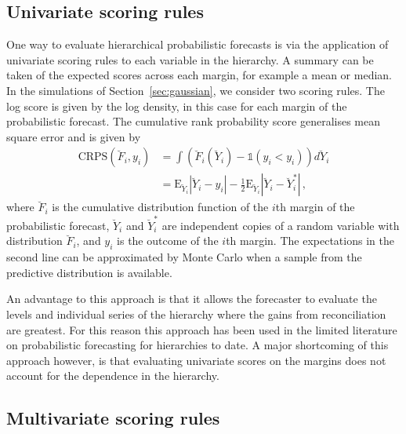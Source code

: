 \documentclass[a4paper, 11pt]{article}
\def\E{\text{E}}
\theoremstyle{definition}
\begin{document}
\subsection{Univariate scoring rules}

One way to evaluate hierarchical probabilistic forecasts is via the application of univariate scoring rules to each variable in the hierarchy. A summary can be taken of the expected scores across each margin, for example a mean or median. In the simulations of Section~\ref{sec:gaussian}, we consider two scoring rules. The log score is given by the log density, in this case for each margin of the probabilistic forecast. The cumulative rank probability score generalises mean square error and is given by
\begin{align} \label{eq:CRPS}
\text{CRPS}(\breve{F}_i,y_{i}) &=\int \left(\breve{F}_i(\breve{Y}_i)-\mathbb{1}(y_i<y_{i})\right)d\breve{Y}_i\\ &=\E_{\breve{Y}_i}|\breve{Y}_{i}-y_{i}| - \frac{1}{2}\E_{\breve{Y}_i}|\breve{Y}_{i}-\breve{Y}^*_{i}|\,,
\end{align}
where $\breve{F}_i$ is the cumulative distribution function of the $i$th margin of the probabilistic forecast, $\breve{Y}_i$ and $\breve{Y}^*_{i}$ are independent copies of a random variable with distribution $\breve{F}_i$, and $y_i$ is the outcome of the $i$th margin. The expectations in the second line can be approximated by Monte Carlo when a sample from the predictive distribution is available.

An advantage to this approach is that it allows the forecaster to evaluate the levels and individual series of the hierarchy where the gains from reconciliation are greatest. For this reason this approach has been used in the limited literature on probabilistic forecasting for hierarchies \citep{BenTaieb2017, JeoEtAl2018} to date. A major shortcoming of this approach however, is that evaluating univariate scores on the margins does not account for the dependence in the hierarchy.

\subsection{Multivariate scoring rules}
\end{document}
